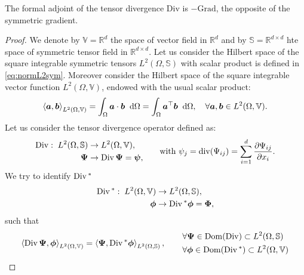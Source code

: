 \begin{theorem}\label{th:adjDiv}
	The formal adjoint of the tensor divergence $\mathrm{Div}$ is $- \mathrm{Grad}$, the opposite of the symmetric gradient.
	\begin{proof}
		We denote by $\mathbb{V} = \mathbb{R}^{d}$ the space of vector field in $\mathbb{R}^{d}$ and by $\mathbb{S} = \mathbb{R}^{d\times d}$ hte space of symmetric tensor field in $\mathbb{R}^{d\times d}$. Let us consider the Hilbert space of the square integrable symmetric tensors $L^2(\Omega, \mathbb{S})$ with scalar product is defined in \eqref{eq:normL2sym}. Moreover consider the Hilbert space of the square integrable vector function $L^2(\Omega, \mathbb{V})$, endowed with the usual scalar product:
		\begin{equation*}
		\left\langle \bm{a} , \bm{b} \right\rangle_{L^2(\Omega, \mathbb{V})} = \int_{\Omega}  \bm{a} \cdot \bm{b} \; \d\Omega = \int_{\Omega} \bm{a}^\top \bm{b}\; \d\Omega, \quad \forall \bm{a}, \bm{b} \in L^2(\Omega, \mathbb{V}). 
		\end{equation*}
		Let us consider the tensor divergence operator defined as:
		\begin{equation*}
		\begin{aligned}
		\Div: \; L^2(\Omega, \mathbb{S})& \rightarrow L^2(\Omega, \mathbb{V}), \\
		\bm{\Psi}& \rightarrow \Div\bm{\Psi} = \bm{\psi}, \\
		\end{aligned}
		\qquad \text{with } \psi_j = \mathrm{div}(\Psi_{ij}) = \sum_{i = 1}^d \diffp{\Psi_{ij}}{x_i}.
		\end{equation*}
		We try to identify $\operatorname*{Div}{}^*$
		\begin{equation*}
		\begin{aligned}
		\operatorname*{Div}{}^*: \; L^2(\Omega, \mathbb{V}) & \rightarrow L^2(\Omega, \mathbb{S}), \\
		\bm{\phi}& \rightarrow  \operatorname*{Div}{}^* \bm{\phi} = \bm{\Phi}, \\
		\end{aligned}
		\end{equation*}
		such that \begin{equation*}
		\left\langle \Div \bm{\Psi} , \bm{\phi} \right\rangle_{L^2(\Omega, \mathbb{V})} = \left\langle \bm{\Psi} , \Div{}^* \bm{\phi} \right\rangle_{L^2(\Omega, \mathbb{S})},
		\begin{aligned} \qquad
		&\forall \bm{\Psi} \in \Dom(\Div) \subset L^2(\Omega, \mathbb{S}) \\
		&\forall \bm{\phi} \in \Dom(\Div{}^*) \subset L^2(\Omega, \mathbb{V})

\end{aligned}
\end{equation*}
\end{proof}
\end{theorem}
